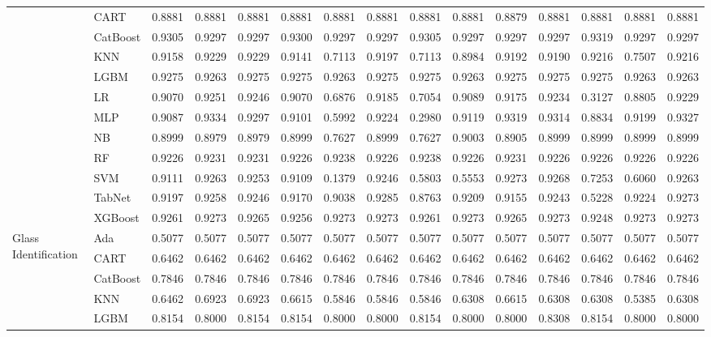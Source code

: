 \begin{table*}[ht]
{\begin{tabular}{llrrrrrrrrrrrrr}
 & CART & 0.8881 & 0.8881 & 0.8881 & 0.8881 & 0.8881 & 0.8881 & 0.8881 & 0.8881 & 0.8879 & 0.8881 & 0.8881 & 0.8881 & 0.8881 \\
 & CatBoost & 0.9305 & 0.9297 & 0.9297 & 0.9300 & 0.9297 & 0.9297 & 0.9305 & 0.9297 & 0.9297 & 0.9297 & 0.9319 & 0.9297 & 0.9297 \\
 & KNN & 0.9158 & 0.9229 & 0.9229 & 0.9141 & 0.7113 & 0.9197 & 0.7113 & 0.8984 & 0.9192 & 0.9190 & 0.9216 & 0.7507 & 0.9216 \\
 & LGBM & 0.9275 & 0.9263 & 0.9275 & 0.9275 & 0.9263 & 0.9275 & 0.9275 & 0.9263 & 0.9275 & 0.9275 & 0.9275 & 0.9263 & 0.9263 \\
 & LR & 0.9070 & 0.9251 & 0.9246 & 0.9070 & 0.6876 & 0.9185 & 0.7054 & 0.9089 & 0.9175 & 0.9234 & 0.3127 & 0.8805 & 0.9229 \\
 & MLP & 0.9087 & 0.9334 & 0.9297 & 0.9101 & 0.5992 & 0.9224 & 0.2980 & 0.9119 & 0.9319 & 0.9314 & 0.8834 & 0.9199 & 0.9327 \\
 & NB & 0.8999 & 0.8979 & 0.8979 & 0.8999 & 0.7627 & 0.8999 & 0.7627 & 0.9003 & 0.8905 & 0.8999 & 0.8999 & 0.8999 & 0.8999 \\
 & RF & 0.9226 & 0.9231 & 0.9231 & 0.9226 & 0.9238 & 0.9226 & 0.9238 & 0.9226 & 0.9231 & 0.9226 & 0.9226 & 0.9226 & 0.9226 \\
 & SVM & 0.9111 & 0.9263 & 0.9253 & 0.9109 & 0.1379 & 0.9246 & 0.5803 & 0.5553 & 0.9273 & 0.9268 & 0.7253 & 0.6060 & 0.9263 \\
 & TabNet & 0.9197 & 0.9258 & 0.9246 & 0.9170 & 0.9038 & 0.9285 & 0.8763 & 0.9209 & 0.9155 & 0.9243 & 0.5228 & 0.9224 & 0.9273 \\
 & XGBoost & 0.9261 & 0.9273 & 0.9265 & 0.9256 & 0.9273 & 0.9273 & 0.9261 & 0.9273 & 0.9265 & 0.9273 & 0.9248 & 0.9273 & 0.9273 \\
\cline{1-15}
\multirow[t]{12}{*}{Glass Identification} & Ada & 0.5077 & 0.5077 & 0.5077 & 0.5077 & 0.5077 & 0.5077 & 0.5077 & 0.5077 & 0.5077 & 0.5077 & 0.5077 & 0.5077 & 0.5077 \\
 & CART & 0.6462 & 0.6462 & 0.6462 & 0.6462 & 0.6462 & 0.6462 & 0.6462 & 0.6462 & 0.6462 & 0.6462 & 0.6462 & 0.6462 & 0.6462 \\
 & CatBoost & 0.7846 & 0.7846 & 0.7846 & 0.7846 & 0.7846 & 0.7846 & 0.7846 & 0.7846 & 0.7846 & 0.7846 & 0.7846 & 0.7846 & 0.7846 \\
 & KNN & 0.6462 & 0.6923 & 0.6923 & 0.6615 & 0.5846 & 0.5846 & 0.5846 & 0.6308 & 0.6615 & 0.6308 & 0.6308 & 0.5385 & 0.6308 \\
 & LGBM & 0.8154 & 0.8000 & 0.8154 & 0.8154 & 0.8000 & 0.8000 & 0.8154 & 0.8000 & 0.8000 & 0.8308 & 0.8154 & 0.8000 & 0.8000 \\

\end{tabular}}
\end{table*}
